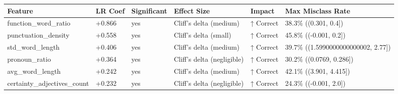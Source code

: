 \begin{tabular}{llllll}
\toprule
Feature & LR Coef & Significant & Effect Size & Impact & Max Misclass Rate \\
\midrule
function\_word\_ratio & +0.866 & yes & Cliff's delta (medium) & ↑ Correct & 38.3\% ((0.301, 0.4]) \\
punctuation\_density & +0.558 & yes & Cliff's delta (small) & ↑ Correct & 45.8\% ((-0.001, 0.2]) \\
std\_word\_length & +0.406 & yes & Cliff's delta (medium) & ↑ Correct & 39.7\% ((1.5990000000000002, 2.77]) \\
pronoun\_ratio & +0.364 & yes & Cliff's delta (negligible) & ↑ Correct & 30.2\% ((0.0769, 0.286]) \\
avg\_word\_length & +0.242 & yes & Cliff's delta (medium) & ↑ Correct & 42.1\% ((3.901, 4.415]) \\
certainty\_adjectives\_count & +0.232 & yes & Cliff's delta (negligible) & ↑ Correct & 24.3\% ((-0.001, 2.0]) \\
\bottomrule
\end{tabular}
